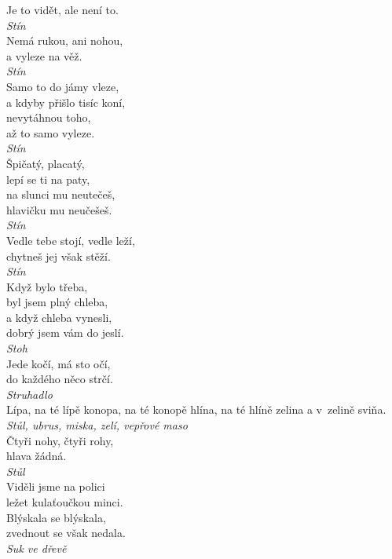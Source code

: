 \begin{multicols}{3}
\noindent
Je to vidět, ale není to.\\[1 mm]
{\sl Stín}\\

\noindent
Nemá rukou, ani nohou,\\
a vyleze na věž.\\[1 mm]
{\sl Stín}\\

\noindent
Samo to do jámy vleze,\\
a kdyby přišlo tisíc koní,\\
nevytáhnou toho,\\
až to samo vyleze.\\[1 mm]
{\sl Stín}\\

\noindent
Špičatý, placatý,\\
lepí se ti na paty,\\
na slunci mu neutečeš,\\
hlavičku mu neučešeš.\\[1 mm]
{\sl Stín}\\

\noindent
Vedle tebe stojí, vedle leží,\\
chytneš jej však stěží.\\[1 mm]
{\sl Stín}\\

\noindent
Když bylo třeba,\\
byl jsem plný chleba,\\
a když chleba vynesli,\\
dobrý jsem vám do jeslí.\\[1 mm]
{\sl Stoh}\\

\noindent
Jede kočí, má sto očí,\\
do každého něco strčí.\\[1 mm]
{\sl Struhadlo}\\

\noindent
Lípa, na té lípě konopa, na té konopě hlína, na té hlíně
zelina a v~zelině sviňa.\\[1 mm]
{\sl Stůl, ubrus, miska, zelí, vepřové maso}\\

\noindent
Čtyři nohy, čtyři rohy,\\
hlava žádná.\\[1 mm]
{\sl Stůl}\\

\noindent
Viděli jsme na polici\\
ležet kulaťoučkou minci.\\
Blýskala se blýskala,\\
zvednout se však nedala.\\[1 mm]
{\sl Suk ve dřevě}\\


\end{multicols}
